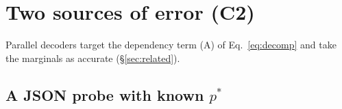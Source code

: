 %
%

\section{Two sources of error (C2)}
\label{sec:c2}

Parallel decoders target the dependency term (A) of Eq.~\ref{eq:decomp}
and take the marginals as accurate (\S\ref{sec:related}).

\subsection{A JSON probe with known $p^*$}
\label{sec:c2-probe}

